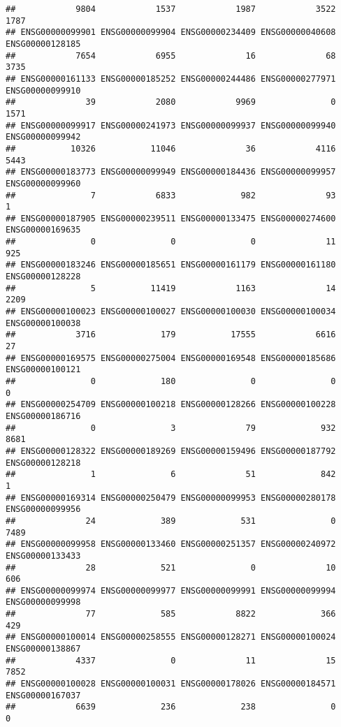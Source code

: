 \documentclass[
]{article}
\begin{document}
\begin{verbatim}
##            9804            1537            1987            3522            1787 
## ENSG00000099901 ENSG00000099904 ENSG00000234409 ENSG00000040608 ENSG00000128185 
##            7654            6955              16              68            3735 
## ENSG00000161133 ENSG00000185252 ENSG00000244486 ENSG00000277971 ENSG00000099910 
##              39            2080            9969               0            1571 
## ENSG00000099917 ENSG00000241973 ENSG00000099937 ENSG00000099940 ENSG00000099942 
##           10326           11046              36            4116            5443 
## ENSG00000183773 ENSG00000099949 ENSG00000184436 ENSG00000099957 ENSG00000099960 
##               7            6833             982              93               1 
## ENSG00000187905 ENSG00000239511 ENSG00000133475 ENSG00000274600 ENSG00000169635 
##               0               0               0              11             925 
## ENSG00000183246 ENSG00000185651 ENSG00000161179 ENSG00000161180 ENSG00000128228 
##               5           11419            1163              14            2209 
## ENSG00000100023 ENSG00000100027 ENSG00000100030 ENSG00000100034 ENSG00000100038 
##            3716             179           17555            6616              27 
## ENSG00000169575 ENSG00000275004 ENSG00000169548 ENSG00000185686 ENSG00000100121 
##               0             180               0               0               0 
## ENSG00000254709 ENSG00000100218 ENSG00000128266 ENSG00000100228 ENSG00000186716 
##               0               3              79             932            8681 
## ENSG00000128322 ENSG00000189269 ENSG00000159496 ENSG00000187792 ENSG00000128218 
##               1               6              51             842               1 
## ENSG00000169314 ENSG00000250479 ENSG00000099953 ENSG00000280178 ENSG00000099956 
##              24             389             531               0            7489 
## ENSG00000099958 ENSG00000133460 ENSG00000251357 ENSG00000240972 ENSG00000133433 
##              28             521               0              10             606 
## ENSG00000099974 ENSG00000099977 ENSG00000099991 ENSG00000099994 ENSG00000099998 
##              77             585            8822             366             429 
## ENSG00000100014 ENSG00000258555 ENSG00000128271 ENSG00000100024 ENSG00000138867 
##            4337               0              11              15            7852 
## ENSG00000100028 ENSG00000100031 ENSG00000178026 ENSG00000184571 ENSG00000167037 
##            6639             236             238               0               0 

\end{verbatim}
\end{document}
